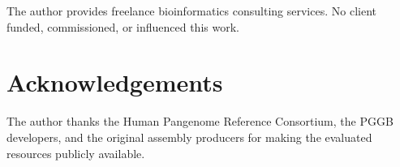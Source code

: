 \documentclass[10pt]{article}
\begin{document}
The author provides freelance bioinformatics consulting services. No client
funded, commissioned, or influenced this work.

\section*{Acknowledgements}

The author thanks the Human Pangenome Reference Consortium, the PGGB developers,
and the original assembly producers for making the evaluated resources publicly
available.

\printbibliography
\end{document}
